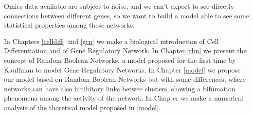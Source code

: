 Omics data available are subject to noise, and we can’t expect to see directly connections between different genes, so we want to build a model able to see some statistical properties among these networks.

In Chapters \ref{celldiff} and \ref{grn} we make a biological introduction of Cell Differentiation and of Gene Regulatory Network.
In Chapter \ref{rbn} we present the concept of Random Boolean Networks, a model proposed for the first time by Kauffman to model Gene Regulatory Networks.
In Chapter \ref{model} we propose our model based on Random Boolean Networks but with some differences, where networks can have also hinibitory links betwee clusters, showing a bifurcation phenomena among the activity of the network.
In Chapter  we make a numerical analysis of the thoretical model proposed in \ref{model}.

